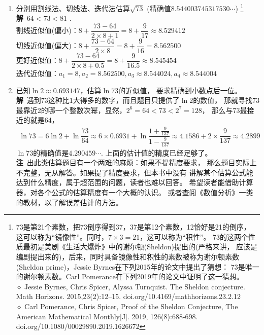 \begin{enumerate}[label={【\textbf{例\thechapter.\arabic*}】},
 leftmargin=\inteval{\myenumleftmargin}pt,
 itemsep=\inteval{\myenumitempsep}pt,
 itemindent=\inteval{\myenumitemindent}pt]
\item 分别用割线法、切线法、迭代法估算$ \sqrt{73} $
(精确值$ 8.544003745317530 \cdots $)
\footnote{73是第21个素数，把73倒序得到37，37是第12个素数，12恰好是21的倒序，
这可以称为“镜像性”。同时，$ 7\times 3=21 $，这可以称为“积性”。
73的这两个性质最初是美剧《生活大爆炸》中的谢尔顿(Sheldon)提出的(严格来讲，
应该是编剧提出来的)，后来，同时具备镜像性和积性的素数被称为谢尔顿素数
(Sheldon prime)，Jessie Byrnes在下列2015年的论文中提出了猜想：
73是唯一的谢尔顿素数。Carl Pomerance在下列2019年的论文中证明了这一猜想。\\
$ \diamond $ Jessie Byrnes, Chris Spicer, Alyssa Turnquist. The Sheldon conjecture. Math Horizons. 2015,23(2):12–15.
doi.org/10.4169/mathhorizons.23.2.12 \\
$ \diamond $ Carl Pomerance, Chris Spicer, Proof of the Sheldon Conjecture, The American Mathematical Monthly[J]. 2019,
126(8):688-698. doi.org/10.1080/00029890.2019.1626672 } \\
\textbf{解}\ $ 64<73<81 $ .\\
割线近似值(偏小)：$ 8+\dfrac{73-64}{2\times 8+1}=8+\dfrac{9}{17}\approx 8.529412 $ \\
切线近似值(偏大)：$ 8+\dfrac{73-64}{2\times 8}=8+\dfrac{9}{16}= 8.562500 $ \\
更好近似值：$ 8+\dfrac{73-64}{2\times 8+0.5}=8+\dfrac{9}{16.5}\approx 8.545454 $ \\
迭代近似值：$ a_1=8,a_2=8.562500,a_3\approx 8.544024,a_4\approx8.544004  $ 

\item 已知$ \ln2\approx 0.693147 $，估算$ \ln 73 $的近似值，
要求精确到小数点后一位。\\
\textbf{解}\ 遇到73这种比1大得多的数字，而且题目只提供了$ \ln2 $的数值，
那就寻找73最靠近2的哪一个整数次幂，显然，$ 2^6=64<73<2^7=128 $，
那么与73最接近的就是64，
\begin{align*}
    \ln 73=6\ln 2+\ln \dfrac{73}{64}\approx 6\times0.6931+
    \ln\dfrac{1+\frac{9}{137}}{1-\frac{9}{137}} 
    \approx 4.1586+2\times \dfrac{9}{137}\approx 4.2899   
\end{align*}
$ \ln 73 $的精确值是$ 4.290459\cdots $. 上面的估计值的精度已经足够了。\\
\textbf{注}\ 出此类估算题目有一个两难的麻烦：如果不提精度要求，
那么题目实际上不完整，无从解答。如果提了精度要求，但本书中没有
讲解某个估算公式能达到什么精度，属于超范围的问题，读者也难以回答。
希望读者能借助计算器，对各个公式的估算精度有一个大概的认识。
或者查阅《数值分析》一类的教材，以了解误差估计的方法。


\end{enumerate}

